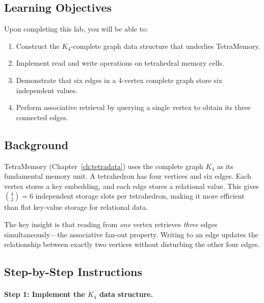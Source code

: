 \subsection{Learning Objectives}

Upon completing this lab, you will be able to:
\begin{enumerate}[leftmargin=1.8em]
  \item Construct the $K_4$-complete graph data structure that underlies TetraMemory.
  \item Implement read and write operations on tetrahedral memory cells.
  \item Demonstrate that six edges in a 4-vertex complete graph store six independent values.
  \item Perform associative retrieval by querying a single vertex to obtain its three connected edges.
\end{enumerate}

\subsection{Background}

TetraMemory (Chapter~\ref{ch:tetradata}) uses the complete graph $K_4$ as its fundamental memory unit. A tetrahedron has four vertices and six edges. Each vertex stores a key embedding, and each edge stores a relational value. This gives $\binom{4}{2} = 6$ independent storage slots per tetrahedron, making it more efficient than flat key-value storage for relational data.

The key insight is that reading from \emph{one} vertex retrieves \emph{three} edges simultaneously---the associative fan-out property. Writing to an edge updates the relationship between exactly two vertices without disturbing the other four edges.

\subsection{Step-by-Step Instructions}

\paragraph{Step 1: Implement the $K_4$ data structure.}

